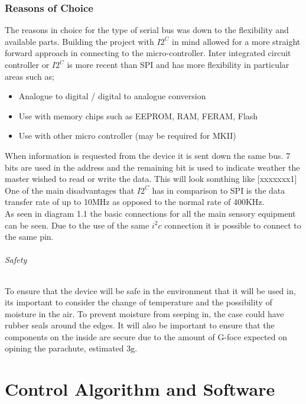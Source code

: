 \documentclass{report}
\begin{document}
\subsection{Reasons of Choice}
The reasons in choice for the type of serial bus was down to the flexibility and available parts. Building the project with $I2^C$ in mind allowed for a more straight forward approach in connecting to the micro-controller. Inter integrated circuit controller or $I2^C$ is more recent than SPI and has more flexibility in particular areas such as;\\

\begin{itemize}
\item Analogue to digital / digital to analogue conversion 
\item Use with memory chips such as EEPROM, RAM, FERAM, Flash
\item Use with other micro controller (may be required for MKII)
\end{itemize}

When information is requested from the device it is sent down the same bus. 7 bits are used in the address and the remaining bit is used to indicate weather the master wished to read or write the data. This will look somthing like [xxxxxxx1]\\
One of the main disadvantages that $I2^C$ has in comparison to SPI is the data transfer rate of up to 10MHz as opposed to the normal rate of 400KHz. \\
As seen in diagram 1.1 the basic connections for all the main sensory equipment can be seen. Due to the use of the same $i^2c$ connection it is possible to connect to the same pin. 

\subparagraph{Safety}
To ensure that the device will be safe in the environment that it will be used in, its important to consider the change of temperature and the possibility of moisture in the air. To prevent moisture from seeping in, the case could have rubber seals around the edges. It will also be important to ensure that the components on the inside are secure due to the amount of G-foce expected on opining the parachute, estimated 3g.


\newpage
\chapter{Control Algorithm and Software}
\end{document}
